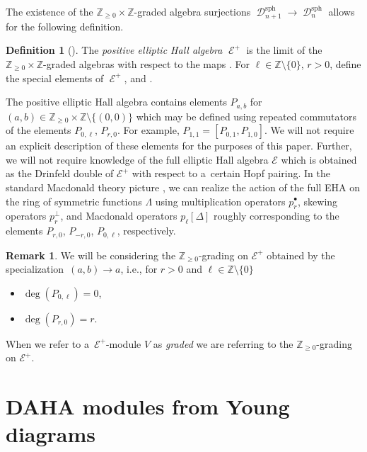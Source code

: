 \documentclass[pdftex]{sigma}
\numberwithin{equation}{section}
\theoremstyle{definition}
\newtheorem{Definition}[Theorem]{Definition}
\newtheorem{Remark}[Theorem]{Remark}
\DeclareMathOperator{\sD}{\mathscr{D}}
\DeclareMathOperator{\sE}{\mathcal{E}}
\begin{document}
The existence of the $\mathbb{Z}_{\geq 0}\times \mathbb{Z}$-graded algebra surjections $\sD_{n+1}^{\mathrm{sph}}\rightarrow \sD_n^{\mathrm{sph}}$ allows for the following definition.

\begin{Definition}[{\cite[Section~1.3]{SV}}]\label{EHA def}
 The \textit{positive elliptic Hall algebra} $\sE^{+}$ is the limit of the $\mathbb{Z}_{\geq0}\times \mathbb{Z}$-graded algebras \smash{$\sD_n^{\mathrm{sph}}$} with respect to the maps \smash{$\sD_{n+1}^{\mathrm{sph}}\rightarrow \sD_n^{\mathrm{sph}}$}. For $\ell \in \mathbb{Z}\setminus \{0\}$, $r > 0$, define the special elements of $\sE^{+}$,  and .
\end{Definition}

The positive elliptic Hall algebra contains elements $P_{a,b}$ for $(a,b) \in \mathbb{Z}_{\geq0}\times \mathbb{Z} \setminus \{(0,0)\}$ which may be defined using repeated commutators of the elements $P_{0,\ell}$, $P_{r,0}$. For example, $P_{1,1} = [P_{0,1},P_{1,0}]$. We will not require an explicit description of these elements for the purposes of this paper. Further, we will not require knowledge of the full elliptic Hall algebra $\mathcal{E}$ which is obtained as the Drinfeld double of $\mathcal{E}^{+}$ with respect to a~certain Hopf pairing. In the standard Macdonald theory picture \cite[Corollary~1.5]{SV}, we can realize the action of the full EHA on the ring of symmetric functions $\Lambda$ using multiplication operators $p_{r}^{\bullet}$, skewing operators $p_{r}^{\perp}$, and Macdonald operators $p_{\ell}[\Delta]$ roughly corresponding to the elements $P_{r,0}$, $P_{-r,0}$, $P_{0,\ell}$, respectively.

\begin{Remark}
 We will be considering the $\mathbb{Z}_{\geq 0}$-grading on $\mathcal{E}^{+}$ obtained by the specialization~${(a,b) \rightarrow a}$, i.e., for $r > 0$ and $\ell \in \mathbb{Z}\setminus \{0\}$
 \begin{itemize}
\itemsep=0pt
 \item $\deg(P_{0,\ell}) = 0$,
 \item $\deg(P_{r,0}) = r$.
 \end{itemize} When we refer to a~$\mathcal{E}^{+}$-module $V$ as \textit{graded} we are referring to the $\mathbb{Z}_{\geq 0}$-grading on $\mathcal{E}^{+}$.
\end{Remark}


\section{DAHA modules from Young diagrams}\label{DAHA Modules from Young Diagrams}
\end{document}
